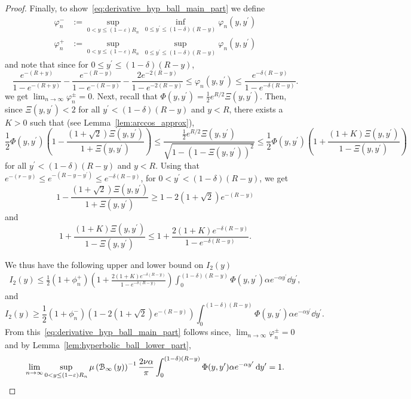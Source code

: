 \begin{proof}
Finally, to show~\eqref{eq:derivative_hyp_ball_main_part} we define 
\begin{align*}
	\varphi^-_n &:= \sup_{0 < y \le (1-\varepsilon)R_n} \, \inf_{0 \le y^\prime \le (1 - \delta)(R-y)} 
		\varphi_n(y,y^\prime)\\
	\varphi^+_n &:= \sup_{0 < y \le (1-\varepsilon)R_n} \, \sup_{0 \le y^\prime \le (1 - \delta)(R-y)} \varphi_n(y,y^\prime)
\end{align*}
and note that since for $0 \le y^\prime \le (1-\delta)(R-y)$,
\[
	\frac{e^{-(R + y)}}{1 - e^{-(R+y)}} - \frac{e^{-(R- y)}}{1 - e^{-(R-y)}} - \frac{2e^{-2(R-y)}}{1 - e^{-2(R-y)}}
	\le \varphi_n(y,y^\prime) \le \frac{e^{-\delta(R-y)}}{1 - e^{-\delta(R-y)}}.
\] 
we get $\lim_{n \to \infty} \varphi^\pm_n = 0$. Next, recall that $\Phi(y,y^\prime) = \frac{1}{2}e^{R/2}\Xi(y,y^\prime)$. Then, since $\Xi(y,y^\prime) < 2$ for all $y^\prime < (1-\delta)(R-y)$ and $y < R$, there exists a $K > 0$ such that (see Lemma~\ref{lem:arccos_approx}),
\[
	\frac{1}{2}\Phi(y,y^\prime)\left(1 - \frac{(1+\sqrt{2})\Xi(y,y^\prime)}{1 + \Xi(y,y^\prime)}\right)
	\le \frac{\frac{1}{2}e^{R/2} \Xi(y,y^\prime)}{\sqrt{1 - \left(1 - \Xi(y,y^\prime)\right)^2}} 
	\le \frac{1}{2}\Phi(y,y^\prime)\left(1 + \frac{(1+K)\Xi(y,y^\prime)}{1 - \Xi(y,y^\prime)}\right)
\]
for all $y^\prime < (1-\delta)(R - y)$ and $y < R$. Using that $e^{-(r-y)} \le e^{-(R - y - y^\prime)} \le e^{-\delta(R- y)}$, for $0 < y^\prime < (1-\delta)(R-y)$, we get
\[
	1 - \frac{(1+\sqrt{2})\Xi(y,y^\prime)}{1 + \Xi(y,y^\prime)} \ge 1 - 2(1+\sqrt{2})e^{-(R-y)}
\]
and
\[
	1 + \frac{(1+K)\Xi(y,y^\prime)}{1 - \Xi(y,y^\prime)} 
	\le 1 + \frac{2(1 + K)e^{-\delta(R - y)}}{1-e^{-\delta(R-y)}}.
\]

We thus have the following upper and lower bound on $I_2(y)$
\begin{align*}
	I_2(y) \le \frac{1}{2} \left(1 + \phi_n^+\right)
	\left(1 + \frac{2(1 + K)e^{-\delta(R - y)}}{1-e^{-\delta(R-y)}}\right)
	\int_{0}^{(1-\delta)(R-y)} \Phi(y,y^\prime) \alpha e^{-\alpha y^\prime} \dd y^\prime,
\end{align*}
and
\[
	I_2(y) \ge \frac{1}{2} \left(1 + \phi_n^-\right)\left(1 - 2(1+\sqrt{2})e^{-(R-y)}\right)
	\int_{0}^{(1-\delta)(R-y)} \Phi(y,y^\prime) \alpha e^{-\alpha y^\prime} \dd y^\prime.
\]
From this~\eqref{eq:derivative_hyp_ball_main_part} follows since, $\lim_{n \to \infty} \varphi_n^\pm = 0$ and by Lemma~\ref{lem:hyperbolic_ball_lower_part},
\[
	\lim_{n \to \infty} \sup_{0 < y \le (1-\varepsilon)R_n} \mu\left({\mathcal B}_{\infty}\left(y\right)\right)^{-1} \frac{2\nu \alpha}{\pi} 
	\int_{0}^{(1-\delta)(R-y)} \Phi(y,y^\prime) \alpha e^{-\alpha y^\prime} \operatorname{\mathrm{d}\hspace{-2pt}} y^\prime
	= 1.
\] 
\end{proof}



